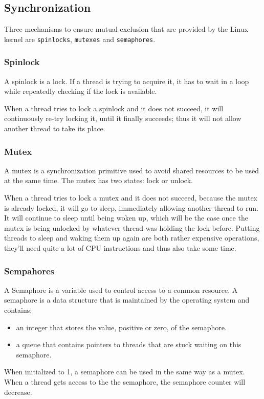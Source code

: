 \documentclass[final,a4paper]{article}
\begin{document}
\subsection*{Synchronization}
Three mechanisms to ensure mutual exclusion that are provided by the Linux
kernel are \texttt{spinlocks}, \texttt{mutexes} and \texttt{semaphores}.

\subsubsection*{Spinlock}
A spinlock is a lock. If a thread is trying to acquire it, it has to wait in a
loop while repeatedly checking if the lock is available.

When a thread tries to lock a spinlock and it does not succeed, it will
continuously re-try locking it, until it finally succeeds; thus it will not
allow another thread to take its place.

\subsubsection*{Mutex}
A mutex is a synchronization primitive used to avoid shared resources to be used
at the same time. The mutex has two states: lock or unlock.

When a thread tries to lock a mutex and it does not succeed, because the mutex
is already locked, it will go to sleep, immediately allowing another thread to
run. It will continue to sleep until being woken up, which will be the case
once the mutex is being unlocked by whatever thread was holding the lock before.
Putting threads to sleep and waking them up again are both rather expensive
operations, they'll need quite a lot of CPU instructions and thus also take some
time.

\subsubsection*{Sempahores}
A Semaphore is a variable used to control access to a common resource. A
semaphore is a data structure that is maintained by the operating system and
contains:
\begin{itemize}
  \setlength\itemsep{-0.5em}
  \item an integer that stores the value, positive or zero, of the semaphore.
  \item a queue that contains pointers to threads that are stuck waiting on this
        semaphore.
\end{itemize}
When initialized to 1, a semaphore can be used in the same way as a mutex.
When a thread gets access to the the semaphore, the semaphore counter will
decrease. 
\end{document}
